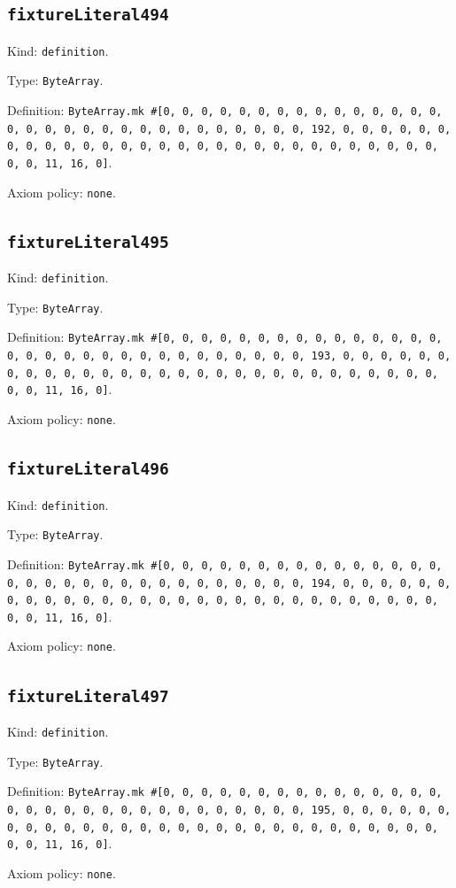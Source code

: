 \documentclass[11pt]{article}
\begin{document}
\subsection*{\texttt{fixtureLiteral494}}
\noindent Kind: \texttt{definition}.\par
\noindent Type: \texttt{ByteArray}.\par
\noindent Definition: \texttt{ByteArray.mk \#[0, 0, 0, 0, 0, 0, 0, 0, 0, 0, 0, 0, 0, 0, 0, 0, 0, 0, 0, 0, 0, 0, 0, 0, 0, 0, 0, 0, 0, 0, 0, 192, 0, 0, 0, 0, 0, 0, 0, 0, 0, 0, 0, 0, 0, 0, 0, 0, 0, 0, 0, 0, 0, 0, 0, 0, 0, 0, 0, 0, 0, 0, 0, 11, 16, 0]}.\par
\noindent Axiom policy: \texttt{none}.\par
\subsection*{\texttt{fixtureLiteral495}}
\noindent Kind: \texttt{definition}.\par
\noindent Type: \texttt{ByteArray}.\par
\noindent Definition: \texttt{ByteArray.mk \#[0, 0, 0, 0, 0, 0, 0, 0, 0, 0, 0, 0, 0, 0, 0, 0, 0, 0, 0, 0, 0, 0, 0, 0, 0, 0, 0, 0, 0, 0, 0, 193, 0, 0, 0, 0, 0, 0, 0, 0, 0, 0, 0, 0, 0, 0, 0, 0, 0, 0, 0, 0, 0, 0, 0, 0, 0, 0, 0, 0, 0, 0, 0, 11, 16, 0]}.\par
\noindent Axiom policy: \texttt{none}.\par
\subsection*{\texttt{fixtureLiteral496}}
\noindent Kind: \texttt{definition}.\par
\noindent Type: \texttt{ByteArray}.\par
\noindent Definition: \texttt{ByteArray.mk \#[0, 0, 0, 0, 0, 0, 0, 0, 0, 0, 0, 0, 0, 0, 0, 0, 0, 0, 0, 0, 0, 0, 0, 0, 0, 0, 0, 0, 0, 0, 0, 194, 0, 0, 0, 0, 0, 0, 0, 0, 0, 0, 0, 0, 0, 0, 0, 0, 0, 0, 0, 0, 0, 0, 0, 0, 0, 0, 0, 0, 0, 0, 0, 11, 16, 0]}.\par
\noindent Axiom policy: \texttt{none}.\par
\subsection*{\texttt{fixtureLiteral497}}
\noindent Kind: \texttt{definition}.\par
\noindent Type: \texttt{ByteArray}.\par
\noindent Definition: \texttt{ByteArray.mk \#[0, 0, 0, 0, 0, 0, 0, 0, 0, 0, 0, 0, 0, 0, 0, 0, 0, 0, 0, 0, 0, 0, 0, 0, 0, 0, 0, 0, 0, 0, 0, 195, 0, 0, 0, 0, 0, 0, 0, 0, 0, 0, 0, 0, 0, 0, 0, 0, 0, 0, 0, 0, 0, 0, 0, 0, 0, 0, 0, 0, 0, 0, 0, 11, 16, 0]}.\par
\noindent Axiom policy: \texttt{none}.\par
\end{document}
